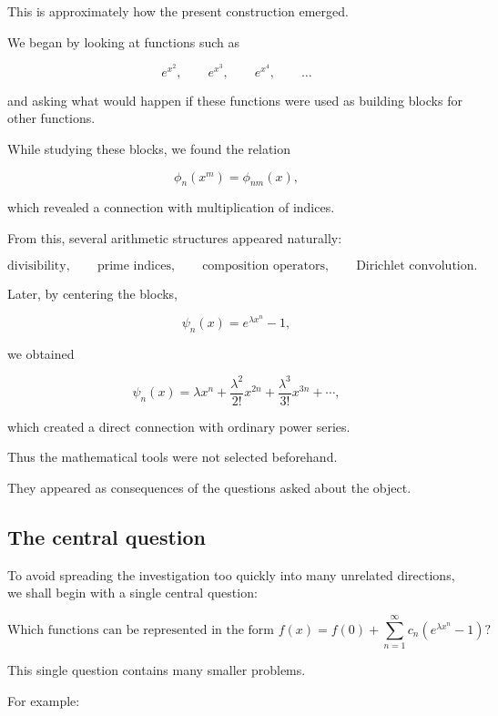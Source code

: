 This is approximately how the present construction emerged.

We began by looking at functions such as

\[
e^{x^2},
\qquad
e^{x^3},
\qquad
e^{x^4},
\qquad
\ldots
\]

and asking what would happen if these functions were used as building
blocks for other functions.

While studying these blocks, we found the relation

\[
\phi_n(x^m)=\phi_{nm}(x),
\]

which revealed a connection with multiplication of indices.

From this, several arithmetic structures appeared naturally:

\[
\text{divisibility},
\qquad
\text{prime indices},
\qquad
\text{composition operators},
\qquad
\text{Dirichlet convolution}.
\]

Later, by centering the blocks,

\[
\psi_n(x)=e^{\lambda x^n}-1,
\]

we obtained

\[
\psi_n(x)
=
\lambda x^n
+
\frac{\lambda^2}{2!}x^{2n}
+
\frac{\lambda^3}{3!}x^{3n}
+\cdots,
\]

which created a direct connection with ordinary power series.

Thus the mathematical tools were not selected beforehand.

They appeared as consequences of the questions asked about the object.

\subsection{The central question}

To avoid spreading the investigation too quickly into many unrelated
directions, we shall begin with a single central question:

\[
\boxed{
\text{Which functions can be represented in the form }
f(x)
=
f(0)
+
\sum_{n=1}^{\infty}
c_n
\left(
e^{\lambda x^n}-1
\right)?
}
\]

This single question contains many smaller problems.

For example:

